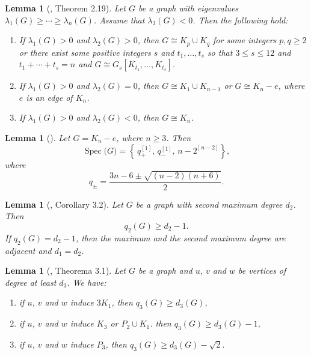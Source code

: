 \documentclass[preprint,12pt]{elsarticle}
\newtheorem{lemma}[theorem]{Lemma}
\begin{document}
\begin{lemma}[\cite{Oboudi2017}, Theorem 2.19]\label{teorema: Oboudi}
Let $G$ be a graph with eigenvalues\linebreak $\lambda_1(G) \geq \cdots \geq \lambda_n(G)$. Assume that $\lambda_3(G) < 0$. Then the following hold:

\begin{enumerate}
\item If $\lambda_1(G) > 0$ and $\lambda_2(G) > 0$, then $G \cong K_p \cup K_q$ for some integers $p, q \geq 2$ or there exist some positive integers $s$ and $t_1, \ldots, t_s$ so that $3 \leq s \leq 12$ and $t_1 + \cdots + t_s = n$ and $G \cong G_s[K_{t_1}, \ldots, K_{t_s}]$.
\item If $\lambda_1(G) > 0$ and $\lambda_2(G) = 0$, then $G \cong K_1 \cup K_{n-1}$ or $G \cong K_n - e$, where $e$ is an edge of $K_n$.
\item If $\lambda_1(G) > 0$ and $\lambda_2(G) < 0$, then $G \cong K_n$.
\end{enumerate} 
\end{lemma}


\begin{lemma}[\cite{Yan2002}]\label{lema: quase completo}
Let \(G = K_n- e\), where \(n\ge 3\). Then
\[
\operatorname{Spec}\big(G \big)
=
\left\{\,q_+^{[1]},\,q_-^{[1]},\, n-2^{[n-2]}\right\},
\]
where
\[
q_{\pm}=\frac{3n-6\pm\sqrt{(n-2)(n+6)}}{2}.
\]


\end{lemma}


\begin{lemma}[\cite{Das}, Corollary 3.2]\label{{q_2}{d_2} - 1}
Let $G$ be a graph with second maximum degree ${d_2}$. Then 
$${q_2}(G) \ge {d_2} - 1.$$
If ${q_2(G)} = {d_2} - 1$, then the maximum and the second maximum degree are adjacent and ${d_1} = {d_2}$.
\end{lemma}


\begin{lemma}[\cite{belardo}, Theorema 3.1]\label{lem: k3comd3}
Let \(G\) be a graph and $u$, $v$ and $w$ be vertices of degree at least $d_3$. We have:
\begin{enumerate}
\item if $u$, $v$ and $w$ induce $3K_1$, then $q_3(G) \ge d_3(G)$,
\item if $u$, $v$ and $w$ induce $K_3$ or ${P_2} \cup {K_1}$. then $q_3(G) \ge d_3(G) - 1$,
\item if $u$, $v$ and $w$ induce $P_3$, then $q_3(G) \ge d_3(G)- \sqrt 2 $.
\end{enumerate} 

\end{lemma}
\end{document}
